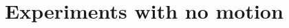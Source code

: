 \documentclass[a4paper,10pt]{article}
\begin{document}

% 
\section{Experiments with no motion}
% 
% 
\end{document}
